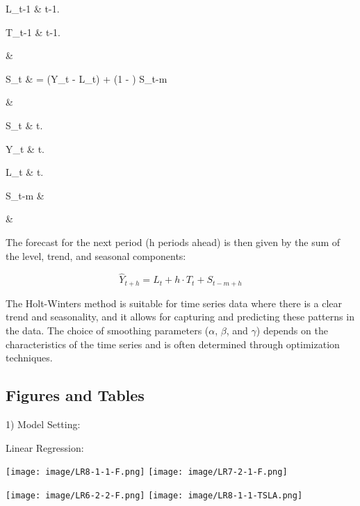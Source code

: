 \documentclass{ieeeojies}
\begin{document}
\hspace{0.5cm}L_{t-1} &  t-1.

\hspace{0.5cm}T_{t-1} &  t-1.

\hspace{0.5cm}\beta & 


S_t & = \gamma \cdot (Y_t - L_t) + (1 - \gamma) \cdot S_{t-m} 

 \quad & 

\hspace{0.5cm}S_t &  t.

\hspace{0.5cm}Y_t &  t.

\hspace{0.5cm}L_t &  t.

\hspace{0.5cm}S_{t-m} &  

\hspace{0.5cm}\gamma & 

The forecast for the next period (h periods ahead) is then given by the sum of the level, trend, and seasonal components:

\[\hat{Y}_{t+h} = L_t + h \cdot T_t + S_{t-m+h}\]

The Holt-Winters method is suitable for time series data where there is a clear trend and seasonality, and it allows for capturing and predicting these patterns in the data. The choice of smoothing parameters (\(\alpha\), \(\beta\), and \(\gamma\)) depends on the characteristics of the time series and is often determined through optimization techniques.


\subsection{Figures and Tables}
1) Model Setting:

Linear Regression:

    \texttt{[image: image/LR8-1-1-F.png]}
    \texttt{[image: image/LR7-2-1-F.png]}
    
    \texttt{[image: image/LR6-2-2-F.png]}
    \hspace{0.1cm}\texttt{[image: image/LR8-1-1-TSLA.png]}
    
\end{document}
